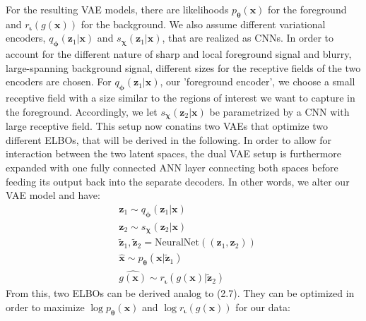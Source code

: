 \documentclass[12pt]{report}
\theoremstyle{definition}
\begin{document}
For the resulting VAE models, there are likelihoods $p_{\pmb{\theta}}(\mathbf{x})$ for the foreground and $r_{\pmb{\iota}}(g(\mathbf{x}))$ for the background. We also assume different variational encoders, $q_{\pmb{\phi}}(\mathbf{z}_1|\mathbf{x})$ and $s_{\pmb{\chi}}(\mathbf{z}_1|\mathbf{x})$, that are realized as CNNs. In order to account for the different nature of sharp and local foreground signal and blurry, large-spanning background signal, different sizes for the receptive fields of the two encoders are chosen. For $q_{\pmb{\phi}}(\mathbf{z}_1|\mathbf{x})$, our 'foreground encoder', we choose a small receptive field with a size similar to the regions of interest we want to capture in the foreground. Accordingly, we let $s_{\pmb{\chi}}(\mathbf{z}_2|\mathbf{x})$ be parametrized by a CNN with large receptive field. This setup now conatins two VAEs that optimize two different ELBOs, that will be derived in the following. In order to allow for interaction between the two latent spaces, the dual VAE setup is furthermore expanded with one fully connected ANN layer connecting both spaces before feeding its output back into the separate decoders. In other words, we alter our VAE model and have:
\begin{equation}
\begin{split}
& \mathbf{z}_1 \sim q_{\pmb{\phi}}(\mathbf{z}_1|\mathbf{x}) \\
& \mathbf{z}_2 \sim s_{\pmb{\chi}}(\mathbf{z}_2|\mathbf{x}) \\
& \tilde{\mathbf{z}}_1, \tilde{\mathbf{z}}_2 = \mathrm{NeuralNet}((\mathbf{z}_1, \mathbf{z}_2)) \\
& \hat{\mathbf{x}} \sim p_{\pmb{\theta}}(\mathbf{x}|\tilde{\mathbf{z}}_1) \\
& \hat{g(\mathbf{x})} \sim r_{\pmb{\iota}}(g(\mathbf{x})|\tilde{\mathbf{z}}_2)
\end{split}
\end{equation}
From this, two ELBOs can be derived analog to (2.7). They can be optimized in order to maximize $\log p_{\pmb{\theta}}(\mathbf{x})$ and $\log r_{\pmb{\iota}}(g(\mathbf{x}))$ for our data:
\end{document}
